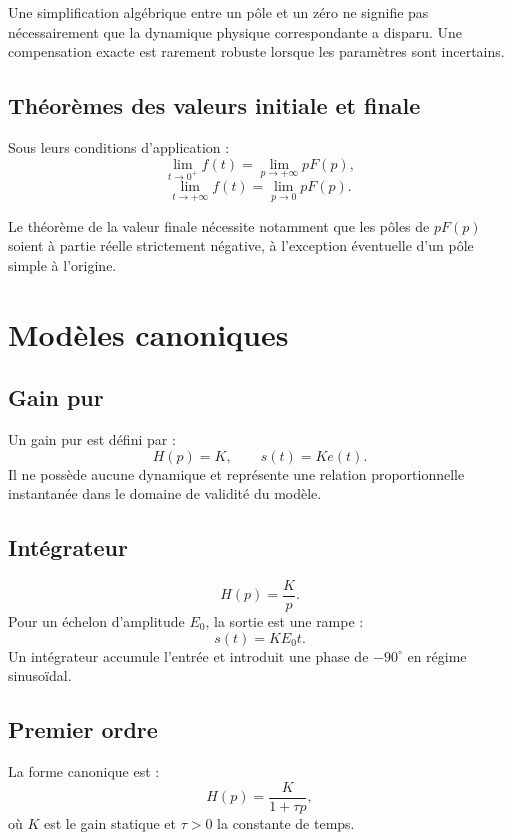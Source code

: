 \begin{SAattention}
Une simplification algébrique entre un pôle et un zéro ne signifie pas nécessairement que la dynamique physique correspondante a disparu. Une compensation exacte est rarement robuste lorsque les paramètres sont incertains.
\end{SAattention}

\subsection{Théorèmes des valeurs initiale et finale}

Sous leurs conditions d'application :
\[
\lim_{t\to0^+}f(t)=\lim_{p\to+\infty}pF(p),
\]
\[
\lim_{t\to+\infty}f(t)=\lim_{p\to0}pF(p).
\]

Le théorème de la valeur finale nécessite notamment que les pôles de $pF(p)$ soient à partie réelle strictement négative, à l'exception éventuelle d'un pôle simple à l'origine.

\section{Modèles canoniques}\label{sec:sa-modeles-canoniques}

\subsection{Gain pur}

Un gain pur est défini par :
\[
H(p)=K,\qquad s(t)=K e(t).
\]
Il ne possède aucune dynamique et représente une relation proportionnelle instantanée dans le domaine de validité du modèle.

\subsection{Intégrateur}

\[
H(p)=\frac{K}{p}.
\]
Pour un échelon d'amplitude $E_0$, la sortie est une rampe :
\[
s(t)=K E_0 t.
\]
Un intégrateur accumule l'entrée et introduit une phase de $-90^\circ$ en régime sinusoïdal.

\subsection{Premier ordre}

La forme canonique est :
\[
\boxed{H(p)=\frac{K}{1+\tau p}},
\]
où $K$ est le gain statique et $\tau>0$ la constante de temps.

